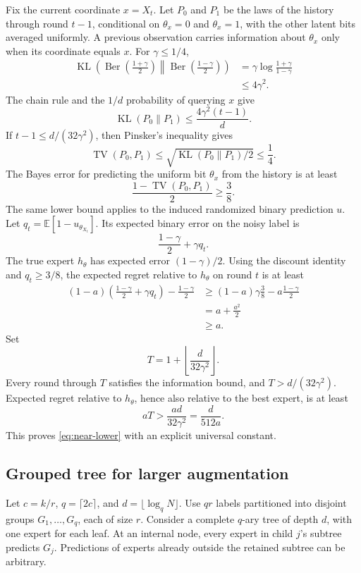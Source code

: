 \documentclass{article}
\theoremstyle{definition}
\theoremstyle{remark}
\newcommand{\E}{\mathbb E}
\newcommand{\1}{\mathbf 1}
\newcommand{\KL}{\operatorname{KL}}
\newcommand{\TV}{\operatorname{TV}}
\newcommand{\Ber}{\operatorname{Ber}}
\begin{document}
Fix the current coordinate \(x=X_t\). Let \(P_0\) and \(P_1\) be the laws of the history through round \(t-1\), conditional on \(\theta_x=0\) and \(\theta_x=1\), with the other latent bits averaged uniformly. A previous observation carries information about \(\theta_x\) only when its coordinate equals \(x\). For \(\gamma\le1/4\),
\begin{align}
\KL\left(
\Ber\left(\frac{1+\gamma}{2}\right)
\middle\|
\Ber\left(\frac{1-\gamma}{2}\right)
\right)
&=\gamma\log\frac{1+\gamma}{1-\gamma}\nonumber\\
&\le4\gamma^2.
\label{eq:ber-kl}
\end{align}
The chain rule and the \(1/d\) probability of querying \(x\) give \[ \KL(P_0\|P_1) \le\frac{4\gamma^2(t-1)}d. \] If \(t-1\le d/(32\gamma^2)\), then Pinsker's inequality gives \[ \TV(P_0,P_1)\le\sqrt{\KL(P_0\|P_1)/2}\le\frac14. \] The Bayes error for predicting the uniform bit \(\theta_x\) from the history is at least \[ \frac{1-\TV(P_0,P_1)}2\ge\frac38. \] The same lower bound applies to the induced randomized binary prediction \(u\). Let \(q_t=\E[1-u_{\theta_{X_t}}]\). Its expected binary error on the noisy label is \[ \frac{1-\gamma}{2}+\gamma q_t. \] The true expert \(h_\theta\) has expected error \((1-\gamma)/2\). Using the discount identity and \(q_t\ge3/8\), the expected regret relative to \(h_\theta\) on round \(t\) is at least
\begin{align*}
(1-a)\left(\frac{1-\gamma}{2}+\gamma q_t\right)
-\frac{1-\gamma}{2}
&\ge(1-a)\gamma\frac38-a\frac{1-\gamma}{2}\\
&=a+\frac{a^2}{2}\\
&\ge a.
\end{align*}
Set \[ T=1+\left\lfloor\frac{d}{32\gamma^2}\right\rfloor. \] Every round through \(T\) satisfies the information bound, and \(T>d/(32\gamma^2)\). Expected regret relative to \(h_\theta\), hence also relative to the best expert, is at least \[ aT>\frac{ad}{32\gamma^2} =\frac{d}{512a}. \] This proves \eqref{eq:near-lower} with an explicit universal constant.

\subsection{Grouped tree for larger augmentation}

Let \(c=k/r\), \(q=\lceil2c\rceil\), and \(d=\lfloor\log_qN\rfloor\). Use \(qr\) labels partitioned into disjoint groups \(G_1,\ldots,G_q\), each of size \(r\). Consider a complete \(q\)-ary tree of depth \(d\), with one expert for each leaf. At an internal node, every expert in child \(j\)'s subtree predicts \(G_j\). Predictions of experts already outside the retained subtree can be arbitrary.
\end{document}

